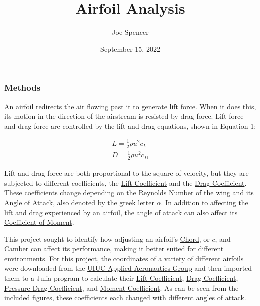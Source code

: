 \documentclass{article}
\begin{document}
\author{Joe Spencer}
\title{Airfoil Analysis}
\date{September 15, 2022}
\maketitle

\subsubsection*{Methods}

An airfoil redirects the air flowing past it to generate lift force. When it does this, its motion in the direction of the airstream is resisted by drag force. Lift force and drag force are controlled by the lift and drag equations, shown in Equation 1:

\begin{equation} \label{eq:1}
\begin{aligned}
        	L = \frac{1}{2} \rho u^{2} c_{L} \\
        	D = \frac{1}{2} \rho u^{2} c_{D}
\end{aligned}
\end{equation}
	
Lift and drag force are both proportional to the square of velocity, but they are subjected to different coefficients, the \hyperlink{CL}{Lift Coefficient} and the \hyperlink{CD}{Drag Coefficient}. These coefficients change depending on the \hyperlink{Re}{Reynolds Number} of the wing and its \hyperlink{alpha}{Angle of Attack}, also denoted by the greek letter $\alpha$. In addition to affecting the lift and drag experienced by an airfoil, the angle of attack can also affect its \hyperlink{CM}{Coefficient of Moment}.\newline

This project sought to identify how adjusting an airfoil's \hyperlink{c}{Chord}, or $c$, and \hyperlink{Camber}{Camber} can affect its performance, making it better suited for different environments. For this project, the coordinates of a variety of different airfoils were downloaded from the \href{https://m-selig.ae.illinois.edu/ads.html}{UIUC Applied Aeronautics Group} and then imported them to a Julia program to calculate their \hyperlink{CL}{Lift Coefficient}, \hyperlink{CD}{Drag Coefficient}, \hyperlink{DP}{Pressure Drag Coefficient}, and \hyperlink{CM}{Moment Coefficient}. As can be seen from the included figures, these coefficients each changed with different angles of attack.\newline
\end{document}
